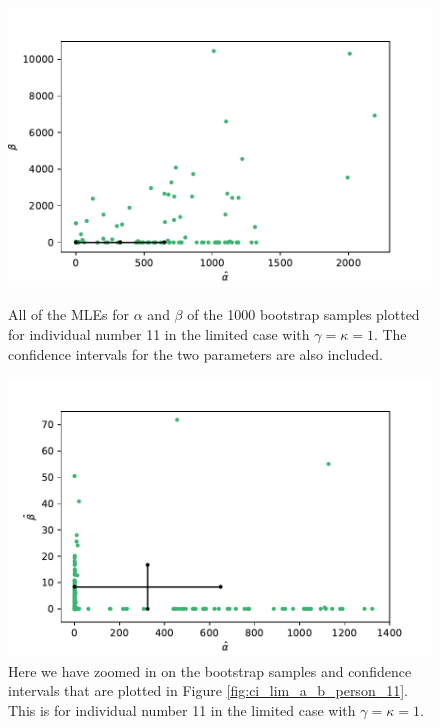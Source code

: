 \begin{figure}
    \centering
    \begin{minipage}{0.48\textwidth}
        \centering
        \includegraphics[scale=0.36]{pictures/ci_lim_a_b_person11_pdf.pdf}
        \caption[MLEs for $\alpha$ and $\beta$ for bootstrap samples individual 11, limited]{All of the MLEs for $\alpha$ and $\beta$ of the 1000 bootstrap samples plotted for individual number 11 in the limited case with $\gamma=\kappa=1$. The confidence intervals for the two parameters are also included.}
        \label{fig:ci_lim_a_b_person_11}
    \end{minipage}\hfill
    \begin{minipage}{0.48\textwidth}
        \centering
        \includegraphics[scale=0.36]{pictures/ci_lim_a_b_person11_zoomed_pdf.pdf}
        \caption[MLEs for $\alpha$ and $\beta$ of bootstrap samples individual 11, limited, zoomed]{Here we have zoomed in on the bootstrap samples and confidence intervals that are plotted in Figure \ref{fig:ci_lim_a_b_person_11}. This is for individual number 11 in the limited case with $\gamma=\kappa=1$.}
        \label{fig:ci_lim_a_b_person_11_zoomed}
    \end{minipage}
\end{figure}

